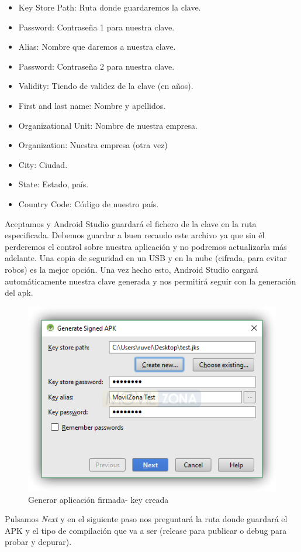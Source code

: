 \begin{itemize}
	\item Key Store Path: Ruta donde guardaremos la clave.
	\item Password: Contraseña 1 para nuestra clave.
	\item Alias: Nombre que daremos a nuestra clave.
	\item Password: Contraseña 2 para nuestra clave.
	\item Validity: Tiendo de validez de la clave (en años).
	\item First and last name: Nombre y apellidos.
	\item Organizational Unit: Nombre de nuestra empresa.
	\item Organization: Nuestra empresa (otra vez)
	\item City: Ciudad.
	\item State: Estado, país.
	\item Country Code: Código de nuestro país.
\end{itemize}


Aceptamos y Android Studio guardará el fichero de la clave en la ruta especificada. Debemos guardar a buen recaudo este archivo ya que sin él perderemos el control sobre nuestra aplicación y no podremos actualizarla más adelante. Una copia de seguridad en un USB y en la nube (cifrada, para evitar robos) es la mejor opción.
Una vez hecho esto, Android Studio cargará automáticamente nuestra clave generada y nos permitirá seguir con la generación del apk.


\begin{figure}[H]
	\centering
	\includegraphics[width=0.6\linewidth]{figuras/build-4}
	\caption{Generar aplicación firmada- key creada}
	\label{fig:bld2}
\end{figure}


Pulsamos \textit{Next} y en el siguiente paso nos preguntará la ruta donde guardará el APK y el tipo de compilación que va a ser (release para publicar o debug para probar y depurar).

